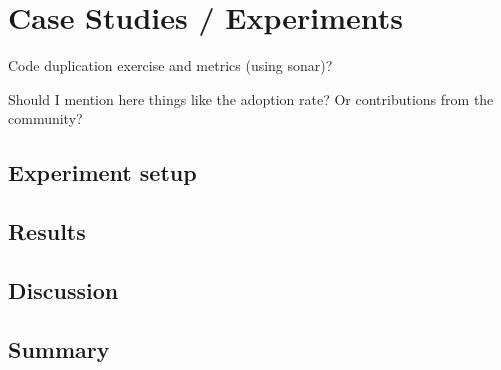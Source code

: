 \chapter{Case Studies / Experiments}

Code duplication exercise and metrics (using sonar)?

\begin{orientador}
Should I mention here things like the adoption rate? Or contributions from the community?
\end{orientador}

	\section{Experiment setup}
    \section{Results}
    \section{Discussion}
	\section{Summary}